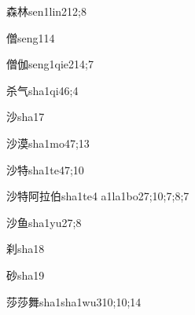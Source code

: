 \begin{verbete}{森林}{sen1lin2}{12;8}
\end{verbete}

\begin{verbete}{僧}{seng1}{14}
\end{verbete}

\begin{verbete}{僧伽}{seng1qie2}{14;7}
\end{verbete}

\begin{verbete}{杀气}{sha1qi4}{6;4}
\end{verbete}

\begin{verbete}{沙}{sha1}{7}
\end{verbete}

\begin{verbete}{沙漠}{sha1mo4}{7;13}
\end{verbete}

\begin{verbete}{沙特}{sha1te4}{7;10}
\end{verbete}

\begin{verbete}{沙特阿拉伯}{sha1te4 a1la1bo2}{7;10;7;8;7}
\end{verbete}

\begin{verbete}{沙鱼}{sha1yu2}{7;8}
\end{verbete}

\begin{verbete}{刹}{sha1}{8}
\end{verbete}

\begin{verbete}{砂}{sha1}{9}
\end{verbete}

\begin{verbete}{莎莎舞}{sha1sha1wu3}{10;10;14}
\end{verbete}

